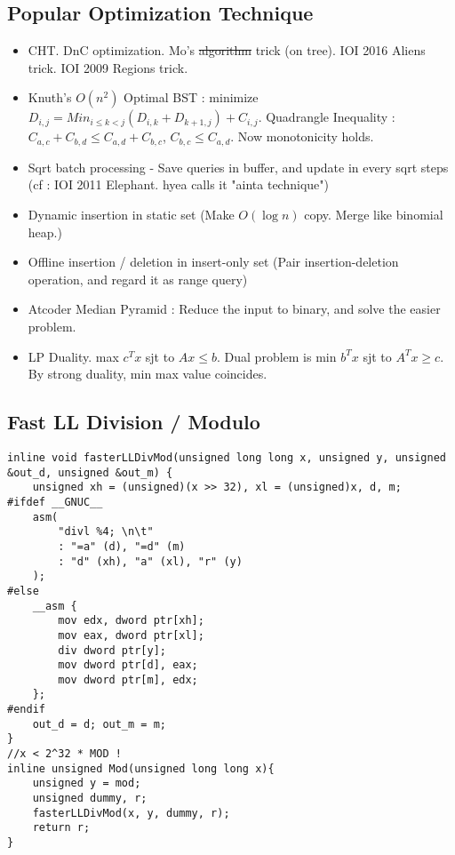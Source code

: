 \documentclass[landscape, 8pt, a4paper, oneside, twocolumn]{extarticle}
\begin{document}
\subsection {Popular Optimization Technique}
\begin{itemize}
	\item CHT. DnC optimization. Mo's \sout{algorithm} trick (on tree). IOI 2016 Aliens trick. IOI 2009 Regions trick.
	\item Knuth's $O(n^2)$ Optimal BST : minimize $D_{i, j} = Min_{i \leq k < j}(D_{i, k} + D_{k+1, j}) + C_{i, j}$. Quadrangle Inequality : $C_{a, c} + C_{b, d} \leq C_{a, d} + C_{b, c}$, $C_{b, c} \leq C_{a, d}$. Now monotonicity holds.
	\item Sqrt batch processing - Save queries in buffer, and update in every sqrt steps (cf : IOI 2011 Elephant. hyea calls it "ainta technique")
	\item Dynamic insertion in static set (Make $O(\log n)$ copy. Merge like binomial heap.)
	\item Offline insertion / deletion in insert-only set (Pair insertion-deletion operation, and regard it as range query)
	\item Atcoder Median Pyramid : Reduce the input to binary, and solve the easier problem.
	\item LP Duality. max $c^Tx$ sjt to $Ax \leq b$. Dual problem is min $b^Tx$ sjt to $A^Tx \geq c$. By strong duality, min max value coincides.
\end{itemize}
\subsection {Fast LL Division / Modulo}
\begin{verbatim}
inline void fasterLLDivMod(unsigned long long x, unsigned y, unsigned &out_d, unsigned &out_m) {
	unsigned xh = (unsigned)(x >> 32), xl = (unsigned)x, d, m;
#ifdef __GNUC__
	asm(
		"divl %4; \n\t"
		: "=a" (d), "=d" (m)
		: "d" (xh), "a" (xl), "r" (y)
	);
#else
	__asm {
		mov edx, dword ptr[xh];
		mov eax, dword ptr[xl];
		div dword ptr[y];
		mov dword ptr[d], eax;
		mov dword ptr[m], edx;
	};
#endif
	out_d = d; out_m = m;
}
//x < 2^32 * MOD !
inline unsigned Mod(unsigned long long x){
	unsigned y = mod;
	unsigned dummy, r;
	fasterLLDivMod(x, y, dummy, r);
	return r;
}
\end{verbatim}
\end{document}
